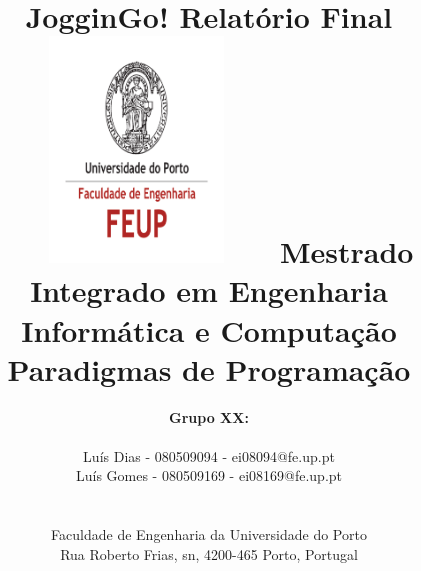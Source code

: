 \documentclass[15pt,a4paper]{article}
\begin{document}
\setlength{\textwidth}{16cm}
\setlength{\textheight}{22cm}

\title{\Large\textbf{JogginGo!}\linebreak\linebreak\linebreak
\Large\textbf{Relatório Final}\linebreak\linebreak
\includegraphics[height=6cm, width=7cm]{feup.pdf}\linebreak \linebreak
\Large{Mestrado Integrado em Engenharia Informática e Computação} \linebreak \linebreak
\Large{Paradigmas de Programação}\linebreak
}

\author{\textbf{Grupo XX:}\\ \\ Luís Dias - 080509094 - ei08094@fe.up.pt \\ Luís Gomes - 080509169 - ei08169@fe.up.pt \\\linebreak\linebreak \\
\\ Faculdade de Engenharia da Universidade do Porto \\ Rua Roberto Frias, s\/n, 4200-465 Porto, Portugal \linebreak\linebreak\linebreak
\linebreak\linebreak\vspace{1cm}}
\maketitle
\thispagestyle{empty}
\end{document}
